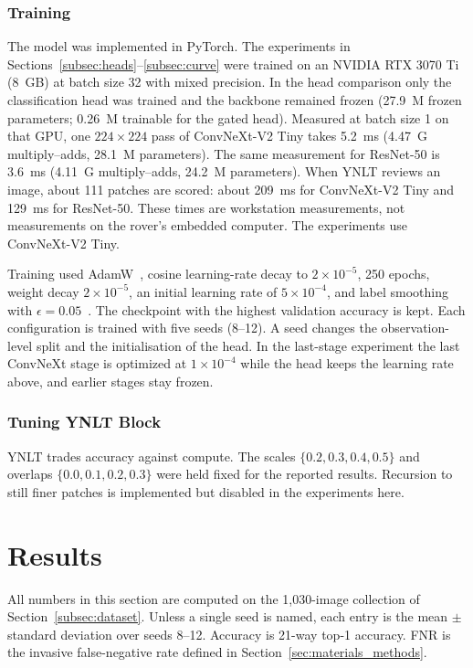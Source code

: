\documentclass[final,3p,times,twocolumn]{elsarticle}
\begin{document}
\subsubsection{Training}
The model was implemented in PyTorch. The experiments in Sections~\ref{subsec:heads}--\ref{subsec:curve} were trained on an NVIDIA RTX 3070 Ti (8~GB) at batch size 32 with mixed precision. In the head comparison only the classification head was trained and the backbone remained frozen (27.9~M frozen parameters; 0.26~M trainable for the gated head). Measured at batch size 1 on that GPU, one \(224\times 224\) pass of ConvNeXt-V2 Tiny takes 5.2~ms (4.47~G multiply--adds, 28.1~M parameters). The same measurement for ResNet-50 is 3.6~ms (4.11~G multiply--adds, 24.2~M parameters). When YNLT reviews an image, about 111 patches are scored: about 209~ms for ConvNeXt-V2 Tiny and 129~ms for ResNet-50. These times are workstation measurements, not measurements on the rover's embedded computer. The experiments use ConvNeXt-V2 Tiny.

Training used AdamW~\citep{loshchilov2019adamw}, cosine learning-rate decay to \(2\times 10^{-5}\), 250 epochs, weight decay \(2\times 10^{-5}\), an initial learning rate of \(5\times 10^{-4}\), and label smoothing with \(\epsilon=0.05\)~\citep{szegedy2016rethinking, Mulleretal2019}. The checkpoint with the highest validation accuracy is kept. Each configuration is trained with five seeds (8--12). A seed changes the observation-level split and the initialisation of the head. In the last-stage experiment the last ConvNeXt stage is optimized at \(1\times 10^{-4}\) while the head keeps the learning rate above, and earlier stages stay frozen.

\subsubsection{Tuning YNLT Block}
YNLT trades accuracy against compute. The scales \(\{0.2,0.3,0.4,0.5\}\) and overlaps \(\{0.0,0.1,0.2,0.3\}\) were held fixed for the reported results. Recursion to still finer patches is implemented but disabled in the experiments here.

\section{Results}
\label{sec:results}

All numbers in this section are computed on the 1{,}030-image collection of Section~\ref{subsec:dataset}. Unless a single seed is named, each entry is the mean \(\pm\) standard deviation over seeds 8--12. Accuracy is 21-way top-1 accuracy. FNR is the invasive false-negative rate defined in Section~\ref{sec:materials_methods}.
\end{document}
